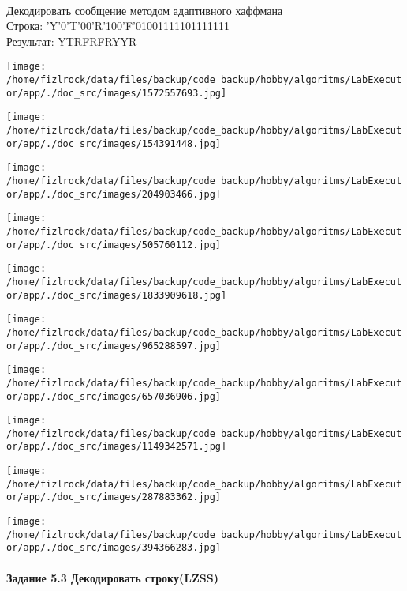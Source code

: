 \documentclass[a4paper, 12pt]{article}
\begin{document}
\\ 

Декодировать сообщение методом адаптивного хаффмана \\
Строка: 
'Y'0'T'00'R'100'F'01001111101111111\\
Результат: YTRFRFRYYR

\texttt{[image: /home/fizlrock/data/files/backup/code\_backup/hobby/algoritms/LabExecutor/app/./doc\_src/images/1572557693.jpg]}

\texttt{[image: /home/fizlrock/data/files/backup/code\_backup/hobby/algoritms/LabExecutor/app/./doc\_src/images/154391448.jpg]}

\texttt{[image: /home/fizlrock/data/files/backup/code\_backup/hobby/algoritms/LabExecutor/app/./doc\_src/images/204903466.jpg]}

\texttt{[image: /home/fizlrock/data/files/backup/code\_backup/hobby/algoritms/LabExecutor/app/./doc\_src/images/505760112.jpg]}

\texttt{[image: /home/fizlrock/data/files/backup/code\_backup/hobby/algoritms/LabExecutor/app/./doc\_src/images/1833909618.jpg]}

\texttt{[image: /home/fizlrock/data/files/backup/code\_backup/hobby/algoritms/LabExecutor/app/./doc\_src/images/965288597.jpg]}

\texttt{[image: /home/fizlrock/data/files/backup/code\_backup/hobby/algoritms/LabExecutor/app/./doc\_src/images/657036906.jpg]}

\texttt{[image: /home/fizlrock/data/files/backup/code\_backup/hobby/algoritms/LabExecutor/app/./doc\_src/images/1149342571.jpg]}

\texttt{[image: /home/fizlrock/data/files/backup/code\_backup/hobby/algoritms/LabExecutor/app/./doc\_src/images/287883362.jpg]}

\texttt{[image: /home/fizlrock/data/files/backup/code\_backup/hobby/algoritms/LabExecutor/app/./doc\_src/images/394366283.jpg]}
\pagebreak
\paragraph{Задание 5.3 Декодировать строку(LZSS)\\}
\end{document}
